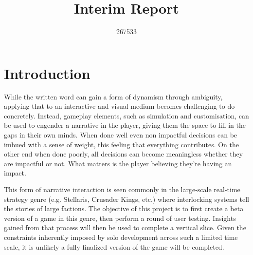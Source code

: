 \documentclass{report}
\begin{document}
\title{Interim Report}
\author{267533}

\maketitle

\section{Introduction}
While the written word can gain a form of dynamism through ambiguity, applying that to an interactive and visual medium becomes challenging to do concretely. Instead, gameplay elements, such as simulation and customisation, can be used to engender a narrative in the player, giving them the space to fill in the gaps in their own minds. When done well even non impactful decisions can be imbued with a sense of weight, this feeling that everything contributes. On the other end when done poorly, all decisions can become meaningless whether they are impactful or not. What matters is the player believing they're having an impact. 

This form of narrative interaction is seen commonly in the large-scale real-time strategy genre (e.g. Stellaris, Crusader Kings, etc.) where interlocking systems tell the stories of large factions. The objective of this project is to first create a beta version of a game in this genre, then perform a round of user testing. Insights gained from that process will then be used to complete a vertical slice. Given the constraints inherently imposed by solo development across such a limited time scale, it is unlikely a fully finalized version of the game will be completed.
\end{document}
